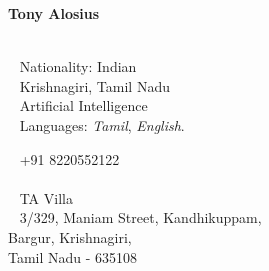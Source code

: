 \documentclass{modernsimplecv}
\begin{document}
\begin{minipage}[t]{0.77\textwidth}
\vspace{0pt} %
\begin{shaded*}

\begin{minipage}[t]{0.4\textwidth}
\vspace{0pt} %
{\par\centering\huge\sans\bfseries{Tony Alosius}} \\[0.3cm]
\faGlobe~ Nationality: Indian\\
\faMapMarker~ Krishnagiri, Tamil Nadu \\

{\small
\faGraduationCap~ {} Artificial Intelligence \\
\faCommentsO~ {Languages:} \emph{Tamil}, \emph{English}.}
\end{minipage}\hfill
\begin{minipage}[t]{0.55\textwidth}
\vspace{0pt} %
\faPhone~ +91 8220552122 \\
\faAt~  \\

\faEnvelopeO~ TA Villa \\ 
\faMapMarker~ 3/329, Maniam Street, Kandhikuppam,\\
                Bargur, Krishnagiri,\\ 
                Tamil Nadu - 635108\\

\faFont~  \\
\faGithub~  \\
\end{minipage}
\hfill
\end{shaded*}
\end{minipage}\\[15pt]



\subsection*{}
\vspace{-3em}
\end{document}
